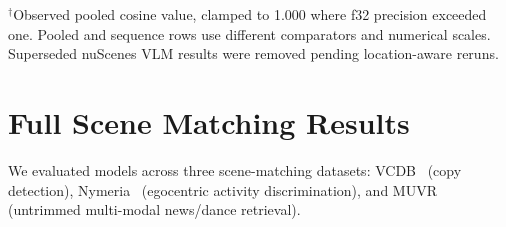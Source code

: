 \documentclass{article}
\theoremstyle{remark}
\begin{document}
\begin{table}[h]
\centering
\caption{VLM embedding probes across all tasks, grouped by pipeline stage. We report generative forward/reverse classification separately in Section~\ref{sec:vlm_generative} (Table~\ref{tab:vlm_generative}).}
\label{tab:summary_vlm}
\begin{flushleft}
\small $^\dagger$Observed pooled cosine value, clamped to 1.000 where f32 precision exceeded one. Pooled and sequence rows use different comparators and numerical scales. Superseded nuScenes VLM results were removed pending location-aware reruns.
\end{flushleft}
\end{table}

\section{Full Scene Matching Results}
\label{sec:scene_matching}

We evaluated models across three scene-matching datasets: VCDB~\cite{vcdb} (copy detection), Nymeria~\cite{nymeria} (egocentric activity discrimination), and MUVR~\cite{muvr} (untrimmed multi-modal news/dance retrieval).
\end{document}
